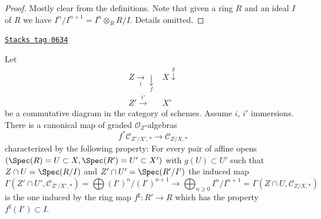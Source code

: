 \begin{proof}
Mostly clear from the definitions. Note that given a ring $R$ and
an ideal $I$ of $R$ we have $I^n/I^{n + 1} = I^n \otimes_R R/I$.
Details omitted.
\end{proof}

\begin{lemma}
\label{divisors-lemma-conormal-algebra-functorial}
\href{https://stacks.math.columbia.edu/tag/0634}{\texttt{Stacks tag 0634}}

Let
$$
\begin{array}{cc}Z \underset{i}{\longrightarrow}\underset{f}{\downarrow} & X \overset{g}{\downarrow} \\ Z' \overset{i'}{\longrightarrow} & X'\end{array}
$$
be a commutative diagram in the category of schemes.
Assume $i$, $i'$ immersions. There is a canonical map
of graded $\mathcal{O}_Z$-algebras
$$
f^*\mathcal{C}_{Z'/X', *}
\longrightarrow
\mathcal{C}_{Z/X, *}
$$
characterized by the following property: For every pair of affine opens
$(\Spec(R) = U \subset X, \Spec(R') = U' \subset X')$ with
$g(U) \subset U'$ such that
$Z \cap U = \Spec(R/I)$ and $Z' \cap U' = \Spec(R'/I')$
the induced map
$$
\Gamma(Z' \cap U', \mathcal{C}_{Z'/X', *}) =
\bigoplus\nolimits (I')^n/(I')^{n + 1}
\longrightarrow
\bigoplus\nolimits_{n \geq 0} I^n/I^{n + 1} =
\Gamma(Z \cap U, \mathcal{C}_{Z/X, *})
$$
is the one induced by the ring map $f^\sharp : R' \to R$ which
has the property $f^\sharp(I') \subset I$.
\end{lemma}

